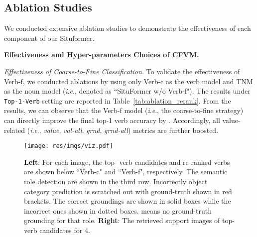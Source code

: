 \documentclass[letterpaper]{article} \usepackage{aaai22}  \usepackage{times}  \usepackage{helvet}  \usepackage{courier}  \usepackage[hyphens]{url}  \usepackage{graphicx} \urlstyle{rm} \def\UrlFont{\rm}  \usepackage{natbib}  \usepackage{caption} \DeclareCaptionStyle{ruled}{labelfont=normalfont,labelsep=colon,strut=off} \frenchspacing  \setlength{\pdfpagewidth}{8.5in}  \setlength{\pdfpageheight}{11in}
\newcommand{\ie}{\textit{i}.\textit{e}.}
\begin{document}
\subsection{Ablation Studies}
We conducted extensive ablation studies to demonstrate the effectiveness of each component of our Situformer.


\noindent\textbf{Effectiveness and Hyper-parameters Choices of CFVM.} 

\noindent\emph{Effectiveness of Coarse-to-Fine Classification.}
To validate the effectiveness of Verb-f, we conducted ablations by using only Verb-c as the verb model and TNM as the noun model (\ie, denoted as ``SituFormer w/o Verb-f"). The results under \texttt{Top-1-Verb} setting are reported in Table~\ref{tab:ablation_rerank}. From the results, we can observe that the Verb-f model (\ie, the coarse-to-fine strategy) can directly improve the final top-1 verb accuracy by . Accordingly, all value-related (\ie, \emph{value}, \emph{val-all}, \emph{grnd}, \emph{grnd-all}) metrics are further boosted. 



\addtolength{\tabcolsep}{-3pt}
\addtolength{\abovecaptionskip}{-5pt}
\begin{table}[t]
    \centering
    \caption{Performance (\%)  under \texttt{Top-1-Verb} setting.}
    \label{tab:ablation_rerank}
\end{table}
\addtolength{\abovecaptionskip}{5pt}
\addtolength{\tabcolsep}{3pt}


\addtolength{\abovecaptionskip}{-10pt}
\begin{figure*}
    \centering
    \texttt{[image: res/imgs/viz.pdf]}
    \caption{\textbf{Left}: For each image, the top- verb candidates and re-ranked verbs are shown below ``Verb-c" and ``Verb-f", respectively. The semantic role detection are shown in the third row. Incorrectly object category prediction is scratched out with ground-truth shown in red brackets. The correct groundings are shown in solid boxes while the incorrect ones shown in dotted boxes.  means no ground-truth grounding for that role. \textbf{Right}: The retrieved support images of top- verb candidates for 4.}
    \label{fig:viz}
\end{figure*}
\addtolength{\abovecaptionskip}{10pt}
\end{document}
